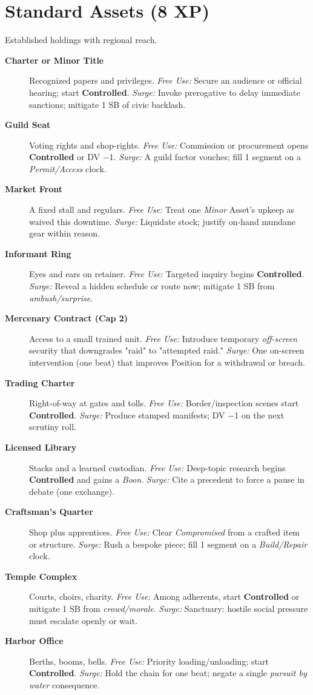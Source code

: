 \section{Standard Assets (8 XP)}
Established holdings with regional reach.
\begin{description}
  \item[\textbf{Charter or Minor Title}]  Recognized papers and privileges. \emph{Free Use:} Secure an audience or official hearing; start \textbf{Controlled}. \emph{Surge:} Invoke prerogative to delay immediate sanctions; mitigate 1 SB of civic backlash.
  \item[\textbf{Guild Seat}]  Voting rights and shop-rights. \emph{Free Use:} Commission or procurement opens \textbf{Controlled} or DV −1. \emph{Surge:} A guild factor vouches; fill 1 segment on a \emph{Permit/Access} clock.
  \item[\textbf{Market Front}]  A fixed stall and regulars. \emph{Free Use:} Treat one \emph{Minor} Asset's upkeep as waived this downtime. \emph{Surge:} Liquidate stock; justify on-hand mundane gear within reason.
  \item[\textbf{Informant Ring}]  Eyes and ears on retainer. \emph{Free Use:} Targeted inquiry begins \textbf{Controlled}. \emph{Surge:} Reveal a hidden schedule or route now; mitigate 1 SB from \emph{ambush/surprise}.
  \item[\textbf{Mercenary Contract (Cap 2)}]  Access to a small trained unit. \emph{Free Use:} Introduce temporary \emph{off-screen} security that downgrades "raid" to "attempted raid." \emph{Surge:} One on-screen intervention (one beat) that improves Position for a withdrawal or breach.
  \item[\textbf{Trading Charter}]  Right-of-way at gates and tolls. \emph{Free Use:} Border/inspection scenes start \textbf{Controlled}. \emph{Surge:} Produce stamped manifests; DV −1 on the next scrutiny roll.
  \item[\textbf{Licensed Library}]  Stacks and a learned custodian. \emph{Free Use:} Deep-topic research begins \textbf{Controlled} and gains a \emph{Boon}. \emph{Surge:} Cite a precedent to force a pause in debate (one exchange).
  \item[\textbf{Craftsman's Quarter}]  Shop plus apprentices. \emph{Free Use:} Clear \emph{Compromised} from a crafted item or structure. \emph{Surge:} Rush a bespoke piece; fill 1 segment on a \emph{Build/Repair} clock.
  \item[\textbf{Temple Complex}]  Courts, choirs, charity. \emph{Free Use:} Among adherents, start \textbf{Controlled} or mitigate 1 SB from \emph{crowd/morale}. \emph{Surge:} Sanctuary: hostile social pressure must escalate openly or wait.
  \item[\textbf{Harbor Office}]  Berths, booms, bells. \emph{Free Use:} Priority loading/unloading; start \textbf{Controlled}. \emph{Surge:} Hold the chain for one beat; negate a single \emph{pursuit by water} consequence.
\end{description}

